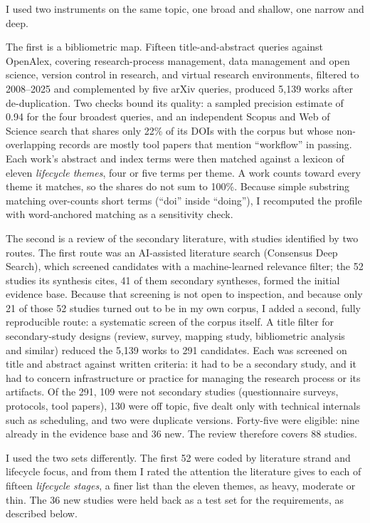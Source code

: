 \documentclass{IEEEcsmag}
\begin{document}
I used two instruments on the same topic, one broad and shallow, one narrow and deep.

The first is a bibliometric map. Fifteen title-and-abstract queries against OpenAlex, covering research-process management, data management and open science, version control in research, and virtual research environments, filtered to 2008--2025 and complemented by five arXiv queries, produced 5{,}139 works after de-duplication. Two checks bound its quality: a sampled precision estimate of 0.94 for the four broadest queries, and an independent Scopus and Web of Science search that shares only 22\% of its DOIs with the corpus but whose non-overlapping records are mostly tool papers that mention ``workflow'' in passing. Each work's abstract and index terms were then matched against a lexicon of eleven \emph{lifecycle themes}, four or five terms per theme. A work counts toward every theme it matches, so the shares do not sum to 100\%. Because simple substring matching over-counts short terms (``doi'' inside ``doing''), I recomputed the profile with word-anchored matching as a sensitivity check.

The second is a review of the secondary literature, with studies identified by two routes. The first route was an AI-assisted literature search (Consensus Deep Search), which screened candidates with a machine-learned relevance filter; the 52 studies its synthesis cites, 41 of them secondary syntheses, formed the initial evidence base. Because that screening is not open to inspection, and because only 21 of those 52 studies turned out to be in my own corpus, I added a second, fully reproducible route: a systematic screen of the corpus itself. A title filter for secondary-study designs (review, survey, mapping study, bibliometric analysis and similar) reduced the 5{,}139 works to 291 candidates. Each was screened on title and abstract against written criteria: it had to be a secondary study, and it had to concern infrastructure or practice for managing the research process or its artifacts. Of the 291, 109 were not secondary studies (questionnaire surveys, protocols, tool papers), 130 were off topic, five dealt only with technical internals such as scheduling, and two were duplicate versions. Forty-five were eligible: nine already in the evidence base and 36 new. The review therefore covers 88 studies.

I used the two sets differently. The first 52 were coded by literature strand and lifecycle focus, and from them I rated the attention the literature gives to each of fifteen \emph{lifecycle stages}, a finer list than the eleven themes, as heavy, moderate or thin. The 36 new studies were held back as a test set for the requirements, as described below.
\end{document}
